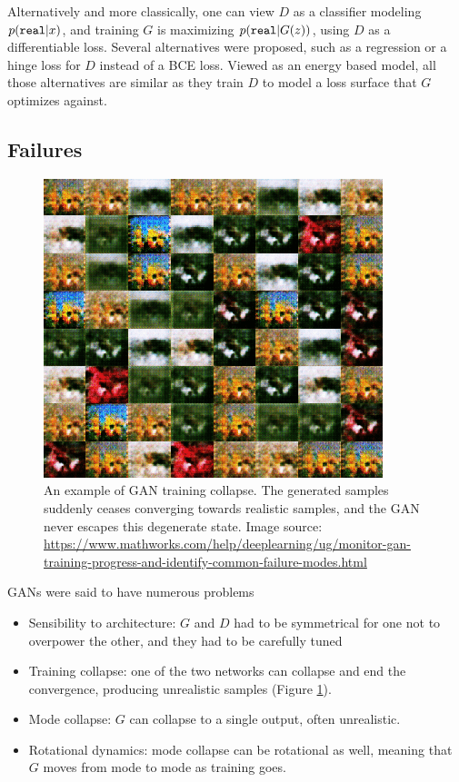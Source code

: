Alternatively and more classically, one can view $D$ as a classifier modeling $p(\texttt{real}|x)$, and training $G$ is maximizing $p(\texttt{real}|G(z))$, using $D$ as a differentiable loss. Several alternatives were proposed, such as a regression or a hinge loss for $D$ instead of a \ac{BCE} loss. Viewed as an energy based model, all those alternatives are similar as they train $D$ to model a loss surface that $G$ optimizes against.

\subsection{Failures}

\begin{figure}
    \centering
    \includegraphics[scale=3]{60-files/gan-training-collapse.png}
    \caption{An example of \ac{GAN} training collapse. The generated samples suddenly ceases converging towards realistic samples, and the \ac{GAN} never escapes this degenerate state. Image source: \url{https://www.mathworks.com/help/deeplearning/ug/monitor-gan-training-progress-and-identify-common-failure-modes.html}}
    \label{fig:trainingcollapse}
\end{figure}

\acp{GAN} were said to have numerous problems

\begin{itemize}
    \item Sensibility to architecture: $G$ and $D$ had to be symmetrical for one not to overpower the other, and they had to be carefully tuned
    \item Training collapse: one of the two networks can collapse and end the convergence, producing unrealistic samples (Figure \ref{fig:trainingcollapse}).
    \item Mode collapse: $G$ can collapse to a single output, often unrealistic.
    \item Rotational dynamics: mode collapse can be rotational as well, meaning that $G$ moves from mode to mode as training goes.
\end{itemize}

